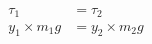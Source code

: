 \documentclass[12pt]{article}
\begin{document}
\begin{align*}
\tau_1 &= \tau_2 \\
y_1 \times m_1g &= y_2 \times m_2g
\end{align*}
\end{document}
